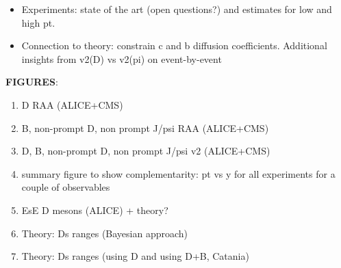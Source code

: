 \begin{itemize}
\item {Experiments:} state of the art (open questions?) and estimates for low and high pt.
\item {Connection to theory:}  constrain c and b diffusion coefficients. Additional insights from v2(D) vs v2(pi) on event-by-event
\end{itemize}

\textbf{FIGURES}:
\begin{enumerate}
\item D RAA (ALICE+CMS)
\item B, non-prompt D, non prompt J/psi RAA (ALICE+CMS) 
\item D, B, non-prompt D, non prompt J/psi  v2 (ALICE+CMS)
\item summary figure to show complementarity: pt vs y for all experiments for a couple of observables
\item EsE D mesons (ALICE) + theory?
\item Theory: Ds ranges (Bayesian approach)
\item Theory: Ds ranges (using D and using D+B, Catania)
\end{enumerate}
